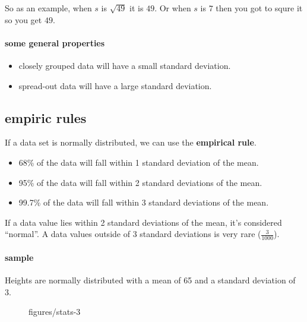\documentclass{book}
\begin{document}
So as an example, when $s$ is $\sqrt{49}$ it is $49$. Or when  $s$ is $7$ then
you got to squre it so you get $49$.

\paragraph{some general properties}
\begin{itemize}
    \item closely grouped data will have a small standard deviation.
    \item spread-out data will have a large standard deviation.
\end{itemize}

\subsection{empiric rules}
If a data set is normally distributed, we can use the \textbf{empirical rule}.
\begin{itemize}
    \item 68\% of the data will fall within 1 standard deviation of the mean.
    \item 95\% of the data will fall within 2 standard deviations of the mean.
    \item 99.7\% of the data will fall within 3 standard deviations of the mean.
\end{itemize}

If a data value lies within 2 standard deviations of the mean, it's considered
``normal''. A data values outside of 3 standard deviations is very rare ($\frac{3}{1000}$).

\paragraph{sample}
Heights are normally distributed with a mean of 65 and a standard deviation of 3.


\begin{figure}[ht]
    \centering
    \caption{figures/stats-3}
    \label{fig:stats-3}
\end{figure}


\end{document}
